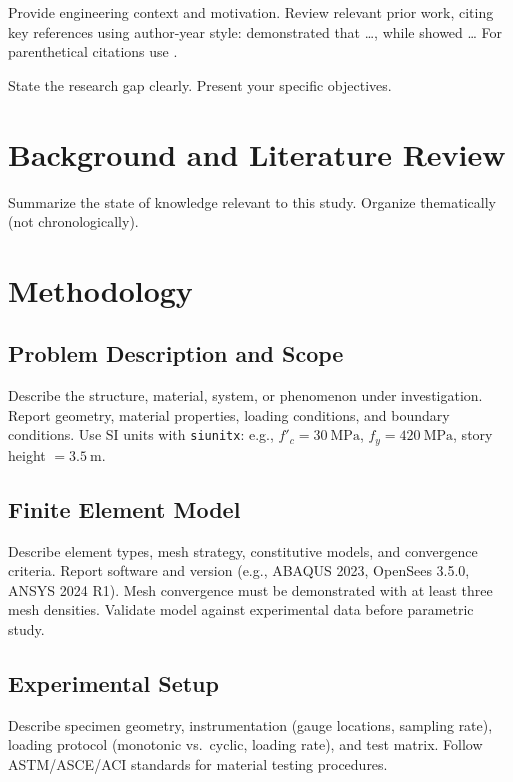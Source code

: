 \documentclass[12pt]{article}
\begin{document}
Provide engineering context and motivation.
Review relevant prior work, citing key references using author-year style:
\citet{Author2023} demonstrated that \ldots, while \citet{Smith2021} showed \ldots
For parenthetical citations use \citep{Jones2022}.

State the research gap clearly.
Present your specific objectives.

\section{Background and Literature Review}

Summarize the state of knowledge relevant to this study.
Organize thematically (not chronologically).

\section{Methodology}

\subsection{Problem Description and Scope}
Describe the structure, material, system, or phenomenon under investigation.
Report geometry, material properties, loading conditions, and boundary conditions.
Use SI units with \texttt{siunitx}: e.g., $f'_c = \SI{30}{\mega\pascal}$,
$f_y = \SI{420}{\mega\pascal}$, story height $= \SI{3.5}{\meter}$.

\subsection{Finite Element Model}
Describe element types, mesh strategy, constitutive models, and convergence criteria.
Report software and version (e.g., ABAQUS 2023, OpenSees 3.5.0, ANSYS 2024 R1).
Mesh convergence must be demonstrated with at least three mesh densities.
Validate model against experimental data before parametric study.

\subsection{Experimental Setup}
Describe specimen geometry, instrumentation (gauge locations, sampling rate),
loading protocol (monotonic vs.\ cyclic, loading rate), and test matrix.
Follow ASTM/ASCE/ACI standards for material testing procedures.
\end{document}

